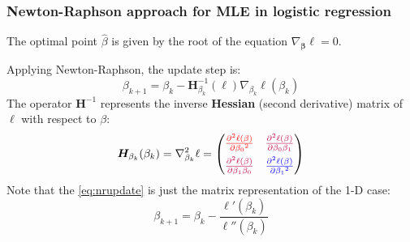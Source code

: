 \documentclass[smaller]{beamer}
\newcommand{\?}{\stackrel{?}{=}}
\newcommand{\fr}{\frac}
\newcommand{\rd}{\color{red}}
\newcommand{\bl}{\color{blue}}
\newcommand{\pl}{\color{purple}}
\newcommand{\pd}[2]{\frac{\partial{#1}}{\partial{#2}}}
\newcommand{\pdd}[2]{\frac{\partial^2{#1}}{\partial{#2}^2}}
\begin{document}
\begin{frame}
  \frametitle{Newton-Raphson approach for MLE in logistic regression}\pause
    The optimal point $\hat\beta$ is given by the root of the equation $\nabla_{\bm\beta}\ell = 0$.\pause

    \bigskip
    
    Applying Newton-Raphson, the update step is:\pause
    \begin{equation}
      \label{eq:nrupdate}
      \beta_{k+1} = \beta_k - {\bm H}^{-1}_{\beta_k}(\ell)\nabla_{\beta_k}\ell(\beta_k)
    \end{equation}
    \pause
    The operator $\bm H^{-1}$ represents the inverse \textbf{Hessian} (second derivative) matrix of $\ell$ with respect to
    $\beta$: \pause
    \begin{equation}
      \label{eq:19}
      {\bm H}_{\beta_k}(\beta_k) =\nabla_{\beta_k}^2\ell=
      \begin{pmatrix}
        \rd \pdd{\ell(\beta)}{\beta_0} & \pl \pd{^2\ell(\beta)}{\beta_0\beta_1} \\[2mm]
        \pl \pd{^2\ell(\beta)}{\beta_1\beta_0} &  \bl \pdd{\ell(\beta)}{\beta_1}\\
      \end{pmatrix}
    \end{equation}\pause
    Note that the \eqref{eq:nrupdate} is just the matrix representation of the 1-D case: \pause
    \begin{equation}
    \beta_{k+1} =\beta_k - \fr{\ell'(\beta_k)}{\ell''(\beta_k)}\label{eq:21}
  \end{equation}

\end{frame}
\end{document}
